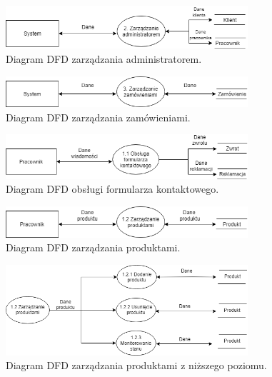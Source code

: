 \documentclass[a4paper,11pt]{article}
\begin{document}
\begin{figure}[H]
	\centering
		\includegraphics[width=0.8\textwidth]{Diagramy/DFD0-DFD2.png}
	\caption{Diagram DFD zarządzania administratorem.}
\end{figure}

\begin{figure}[H]
	\centering
		\includegraphics[width=0.8\textwidth]{Diagramy/DFD0-DFD3.png}
	\caption{Diagram DFD zarządzania zamówieniami.}
\end{figure}

\begin{figure}[H]
	\centering
		\includegraphics[width=0.8\textwidth]{Diagramy/DFD0-DFD11.png}
	\caption{Diagram DFD obsługi formularza kontaktowego.}
\end{figure}


\begin{figure}[H]
	\centering
		\includegraphics[width=0.8\textwidth]{Diagramy/DFD0-DFD12.png}
	\caption{Diagram DFD zarządzania produktami.}
\end{figure}

\begin{figure}[H]
	\centering
		\includegraphics[width=0.8\textwidth]{Diagramy/DFD0-pracownik-produkt.png}
	\caption{Diagram DFD zarządzania produktami z niższego poziomu.}
\end{figure}
\end{document}
